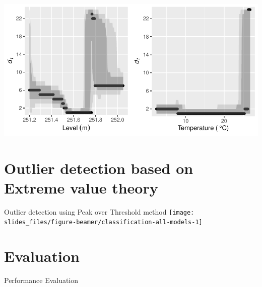\documentclass[14pt,ignorenonframetext,compress]{beamer}
\begin{document}
\begin{frame}
\includegraphics[width=1\linewidth]{plots/vis_dt}
\end{frame}

\hypertarget{outlier-detection-based-on-extreme-value-theory}{%
\section{Outlier detection based on Extreme value
theory}\label{outlier-detection-based-on-extreme-value-theory}}

\begin{frame}{Outlier detection using Peak over Threshold method}
\protect\hypertarget{outlier-detection-using-peak-over-threshold-method}{}
\texttt{[image: slides\_files/figure-beamer/classification-all-models-1]}
\end{frame}

\hypertarget{evaluation}{%
\section{Evaluation}\label{evaluation}}

\begin{frame}{Performance Evaluation}
\protect\hypertarget{performance-evaluation}{}
\begin{table}
\centering\begingroup\fontsize{7}{9}\selectfont

\endgroup{}
\end{table}
\end{frame}
\end{document}
